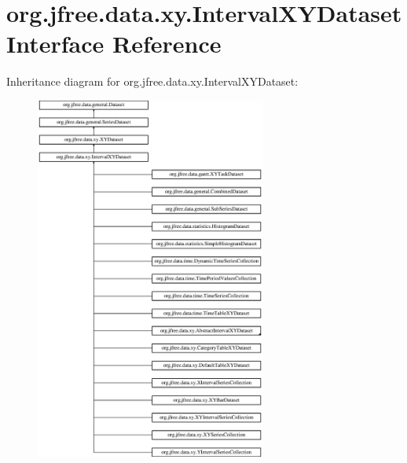 \hypertarget{interfaceorg_1_1jfree_1_1data_1_1xy_1_1_interval_x_y_dataset}{}\section{org.\+jfree.\+data.\+xy.\+Interval\+X\+Y\+Dataset Interface Reference}
\label{interfaceorg_1_1jfree_1_1data_1_1xy_1_1_interval_x_y_dataset}
Inheritance diagram for org.\+jfree.\+data.\+xy.\+Interval\+X\+Y\+Dataset\+:\begin{figure}[H]
\begin{center}
\leavevmode
\includegraphics[height=12.000000cm]{interfaceorg_1_1jfree_1_1data_1_1xy_1_1_interval_x_y_dataset}
\end{center}
\end{figure}
